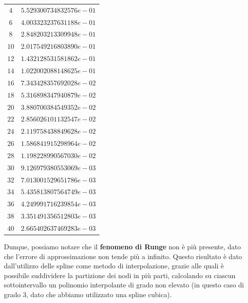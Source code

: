 \begin{table}[H]
\begin{minipage}{0.5\textwidth}
\begin{tabular}{|c|c|}
			$4$  & $5.529300734832576e-01$ \\
			$6$  & $4.003323237631188e-01$ \\
			$8$  & $2.848203213309948e-01$ \\
			$10$ & $2.017549216803890e-01$ \\
			$12$ & $1.432128531581862e-01$ \\
			$14$ & $1.022002088148625e-01$ \\
			$16$ & $7.343428357692028e-02$ \\
			$18$ & $5.316898347940879e-02$ \\
			$20$ & $3.880700384549352e-02$ \\
			$22$ & $2.856026101132547e-02$ \\
			$24$ & $2.119758438849628e-02$ \\
			$26$ & $1.586841915298964e-02$ \\
			$28$ & $1.198228990567030e-02$ \\
			$30$ & $9.126979380553069e-03$ \\
			$32$ & $7.013001529651786e-03$ \\
			$34$ & $5.435813807564749e-03$ \\
			$36$ & $4.249991716239854e-03$ \\
			$38$ & $3.351491356512803e-03$ \\
			$40$ & $2.665402637469283e-03$ \\
			\hline
		\end{tabular}
	\end{minipage}
\end{table}

Dunque, possiamo notare che il \textbf{fenomeno di Runge} non è più presente, dato che l'errore di approssimazione non tende più a infinito. Questo risultato è dato
dall'utilizzo delle spline come metodo di interpolazione, grazie alle quali è possibile suddividere la partizione dei nodi in più parti, calcolando su
ciascun sottointervallo un polinomio interpolante di grado non elevato (in questo caso di grado 3, dato che abbiamo utilizzato una spline cubica).
